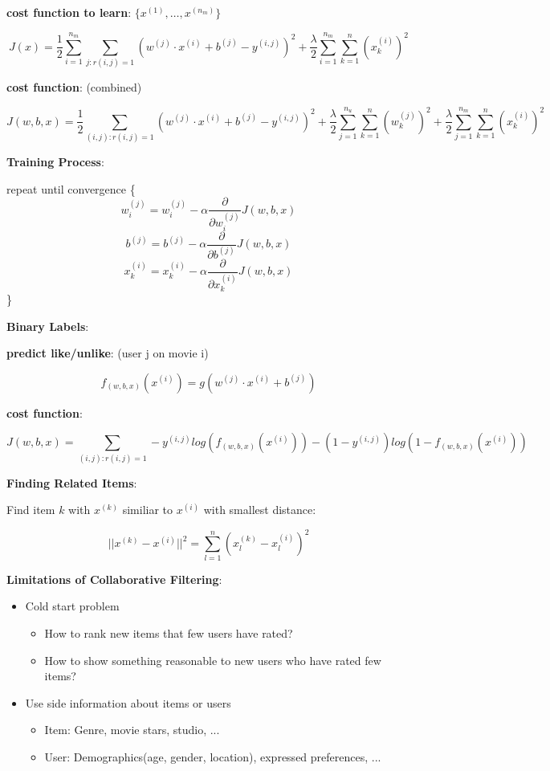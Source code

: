 \documentclass{article}
\begin{document}
\textbf{cost function to learn}: \(\{x^{(1)}, \dots, x^{(n_m)}\}\)

\[J(x) = \frac{1}{2} \sum_{i = 1}^{n_m} \sum_{j:r(i, j)=1} (w^{(j)} \cdot x^{(i)} + b^{(j)} - y^{(i, j)})^2 + \frac{\lambda}{2} \sum_{i = 1}^{n_m} \sum_{k = 1}^{n} (x_{k}^{(i)})^2\]

\textbf{cost function}: (combined)

\[J(w, b, x) = \frac{1}{2} \sum_{(i, j):r(i, j)=1} (w^{(j)} \cdot x^{(i)} + b^{(j)} - y^{(i, j)})^2 + \frac{\lambda}{2} \sum_{j = 1}^{n_u} \sum_{k = 1}^{n} (w_{k}^{(j)})^2 + \frac{\lambda}{2} \sum_{j = 1}^{n_m} \sum_{k = 1}^{n} (x_{k}^{(i)})^2\]

\textbf{Training Process}:

repeat until convergence \{
\[w_{i}^{(j)} = w_{i}^{(j)} - \alpha \frac{\partial}{\partial w_{i}^{(j)}} J(w, b, x)\]
\[b^{(j)} = b^{(j)} - \alpha \frac{\partial}{\partial b^{(j)}} J(w, b, x)\]
\[x_{k}^{(i)} = x_{k}^{(i)} - \alpha \frac{\partial}{\partial x_{k}^{(i)}} J(w, b, x)\]
\}

\textbf{Binary Labels}:

\textbf{predict like/unlike}: (user j on movie i)

\[f_{(w, b, x)}(x^{(i)}) = g(w^{(j)} \cdot x^{(i)} + b^{(j)})\]

\textbf{cost function}:

\[J(w, b, x) = \sum_{(i, j):r(i, j)=1} -y^{(i, j)} log(f_{(w, b, x)}(x^{(i)})) - (1 - y^{(i, j)})log(1 - f_{(w, b, x)}(x^{(i)}))\]

\textbf{Finding Related Items}:

Find item \(k\) with \(x^{(k)}\) similiar to \(x^{(i)}\) with smallest distance:

\[\vert\vert x^{(k)} - x^{(i)} \vert\vert^2 = \sum_{l=1}^{n} (x_{l}^{(k)} - x_{l}^{(i)})^2\]

\textbf{Limitations of Collaborative Filtering}:

\begin{itemize}
    \item Cold start problem
    \begin{itemize}
        \item How to rank new items that few users have rated?
        \item How to show something reasonable to new users who have rated few items?
    \end{itemize}
    \item Use side information about items or users
    \begin{itemize}
        \item Item: Genre, movie stars, studio, ...
        \item User: Demographics(age, gender, location), expressed
preferences, ...
    \end{itemize}
\end{itemize}
\end{document}
